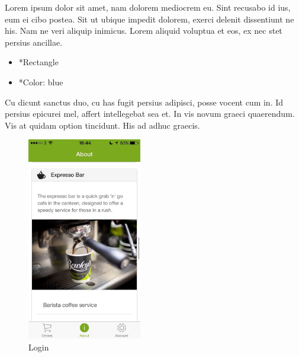 \begin{minipage}{0.55\textwidth}
	Lorem ipsum dolor sit amet, nam dolorem mediocrem eu. Sint recusabo id ius, eum ei cibo postea. Sit ut ubique impedit dolorem, exerci delenit dissentiunt ne his. Nam ne veri aliquip inimicus. Lorem aliquid voluptua et eos, ex nec stet persius ancillae.
	\begin{itemize}
		\item *Rectangle
		\item *Color: blue
	\end{itemize}
	Cu dicunt sanctus duo, cu has fugit persius adipisci, posse vocent cum in. Id persius epicurei mel, affert intellegebat sea et. In vis novum graeci quaerendum. Vis at quidam option tincidunt. His ad adhuc graecis.
\end{minipage}
\begin{minipage}{5cm}
	\begin{figure}[H]
		\includegraphics[width=5cm]{img/mobile-app/screen-shots/IMG_2912.jpg}
		\caption{Login}
	\end{figure}
\end{minipage} \hfill

